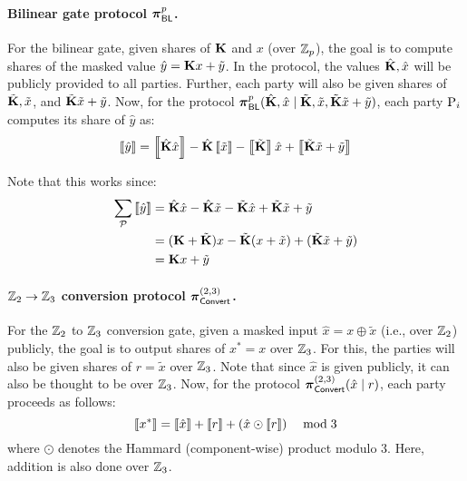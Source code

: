 \paragraph{Bilinear gate protocol $\boldsymbol{\pi}_{\textsf{BL}}^p$.}
For the bilinear gate, given shares of $\mat{K}$ and $x$ (over $\mathbb{Z}_p$), the goal is to compute shares of the masked value $\hat{y} = \mat{K}x + \tilde{y}$. In the protocol, the values $\hat{\mat{K}}, \hat{x}$ will be publicly provided to all parties. Further, each party will also be given shares of $\tilde{\mat{K}}, \tilde{x}$, and $\tilde{\mat{K}}\tilde{x} + \tilde{y}$. Now, for the protocol $\prot_\BLMap^p(\hat{\mat{K}},\hat{x}\mid \tilde{\mat{K}}, \tilde{x}, \tilde{\mat{K}}\tilde{x} + \tilde{y})$, each party $\textnormal{P}_i$ computes its share of $\hat{y}$ as:
\[
    \share{\hat{y}} = \share{\hat{\mat{K}}\hat{x}} - \hat{\mat{K}}\share{\tilde{x}} - \share{\tilde{\mat{K}}}\hat{x} + \share{\tilde{\mat{K}}\tilde{x} + \tilde{y}}
\]

\noindent Note that this works since:
\begin{align*}
\sum_\parties \share{\hat{y}} &= \hat{\mat{K}}\hat{x} - \hat{\mat{K}}\tilde{x} - \tilde{\mat{K}}\hat{x} + \tilde{\mat{K}}\tilde{x} + \tilde{y} \\
&= (\mat{K} + \tilde{\mat{K}})x - \tilde{\mat{K}}(x + \tilde{x}) + (\tilde{\mat{K}}\tilde{x} + \tilde{y}) \\
&= \mat{K}x + \tilde{y}
\end{align*}

\paragraph{$\mathbb{Z}_2 \to \mathbb{Z}_3$ conversion protocol $\boldsymbol{\pi}_{\textsf{Convert}}^{(2,3)}$.}
For the $\mathbb{Z}_2$ to $\mathbb{Z}_3$ conversion gate, given a masked input $\hat{x} = x \oplus \tilde{x}$ (i.e., over $\mathbb{Z}_2$) publicly, the goal is to output shares of $x^* = x$ over $\mathbb{Z}_3$. For this, the parties will also be given shares of $r = \tilde{x}$ over $\mathbb{Z}_3$. Note that since $\hat{x}$ is given publicly, it can also be thought to be over $\mathbb{Z}_3$. Now, for the protocol $\boldsymbol{\pi}_{\textsf{Convert}}^{(2,3)}(\hat{x} \mid r)$, each party proceeds as follows:
\[
\left\llbracket x^* \right\rrbracket = \left\llbracket \hat{x} \right\rrbracket + \left\llbracket r \right\rrbracket + (\hat{x} \odot \left\llbracket r \right\rrbracket) \quad \bmod 3
\]
where $\odot$ denotes the Hammard (component-wise) product modulo 3. Here, addition is also done over $\mathbb{Z}_3$. \\

